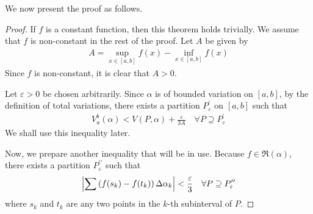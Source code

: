 \documentclass[thmcnt=section, 12pt]{my-elegantbook}
\begin{document}
We now present the proof as follows.

\begin{proof}
    If $f$ is a constant function, then this theorem holds trivially. We assume that $f$ is non-constant in the rest of the proof. Let $A$ be given by 
    \begin{align*}
        A = \sup_{x \in [a, b]} f(x) - \inf_{x \in [a, b]} f(x)
    \end{align*}
    Since $f$ is non-constant, it is clear that $A > 0$.
    
    Let $\varepsilon > 0$ be chosen arbitrarily. Since $\alpha$ is of bounded variation on $[a, b]$, by the definition of total variations, there exists a partition $P^\prime_\varepsilon$ on $[a, b]$ such that 
    \begin{align}
        V_a^b(\alpha) 
        < V(P, \alpha)
        + \frac{\varepsilon}{3A}
        \quad \forall P \supseteq P^\prime_\varepsilon
        \label{eq:85}
    \end{align}
    We shall use this inequality later.

    \par Now, we prepare another inequality that will be in use. Because $f \in \mathfrak{R}(\alpha)$, there exists a partition $P^{\prime\prime}_\varepsilon$ such that
    \begin{align}
        \left\lvert 
            \sum \left(f(s_k) - f(t_k)\right) 
            \Delta \alpha_k
         \right\rvert < \frac{\varepsilon}{3}
        \quad \forall P \supseteq P^{\prime\prime}_\varepsilon
        \label{eq:86}
    \end{align}
    where $s_k$ and $t_k$ are any two points in the $k$-th subinterval of $P$.


\end{proof}
\end{document}
